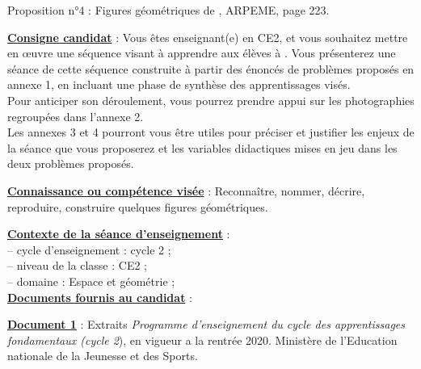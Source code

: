 \activites

\textcolor{G1}{Proposition n°4 : Figures géométriques de  \fg, ARPEME, page 223.} \bigskip

{\bf\uline{Consigne candidat}} : Vous êtes enseignant(e) en CE2, et vous souhaitez mettre en œuvre une séquence visant à apprendre aux élèves à  \fg. \bigskip
Vous présenterez une séance de cette séquence construite à partir des énoncés de problèmes proposés en annexe 1, en incluant une phase de synthèse des apprentissages visés. \\
Pour anticiper son déroulement, vous pourrez prendre appui sur les photographies regroupées dans l’annexe 2. \\
Les annexes 3 et 4 pourront vous être utiles pour préciser et justifier les enjeux de la séance que vous proposerez et les variables didactiques mises en jeu dans les deux problèmes proposés. \bigskip

{\bf\uline{Connaissance ou compétence visée}} : Reconnaître, nommer, décrire, reproduire, construire quelques figures géométriques. \bigskip

{\bf\uline{Contexte de la séance d'enseignement}} : \\
   \hspace*{5mm} -- cycle d'enseignement : cycle 2 ; \\
   \hspace*{5mm} -- niveau de la classe : CE2 ; \\
   \hspace*{5mm} -- domaine : Espace et géométrie ; \\ [2mm]

{\bf\uline{Documents fournis au candidat}} : \bigskip

{\bf\uline{Document 1}} : Extraits {\it Programme d’enseignement du cycle des apprentissages fondamentaux (cycle 2}), en vigueur a la rentrée 2020. Ministère de l'Education nationale de la Jeunesse et des Sports. \bigskip

